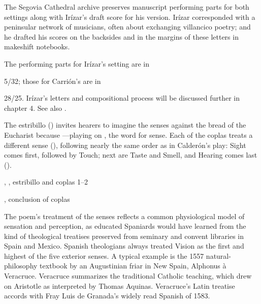 The Segovia Cathedral archive preserves manuscript performing parts for both settings along with Irízar's draft score for his version.
Irízar corresponded with a peninsular network of musicians, often about exchanging villancico poetry; and he drafted his scores on the backsides and in the margins of these letters in makeshift notebooks.
\begin{Footnote}
    The performing parts for Irízar's setting are in \signature{E-SE}{5/32}; those for Carrión's are in \signature{E-SE}{28/25}.
    Irízar's letters and compositional process will be discussed further in chapter 4. %
    See also \Autocites{LopezCalo:IrizarLetters1}{Olarte:Irizar}{Rodriguez:Networks}.
\end{Footnote}

The estribillo () invites hearers to imagine the senses  against the bread of the Eucharist because ---playing on , the word for sense.
Each of the coplas treats a different sense (), following nearly the same order as in Calderón's play: 
Sight comes first, followed by Touch; next are Taste and Smell, and Hearing comes last ().

\begin{expoem}
    \caption{, , estribillo and coplas 1--2}
    \label{expoem:Si_los_sentidos-Sanchez-estribillo}
\end{expoem}
\begin{expoem}
    \caption{, conclusion of coplas}
    \label{expoem:Si_los_sentidos-Sanchez-coplas}
\end{expoem}


The poem's treatment of the senses reflects a common physiological model of sensation and perception, as educated Spaniards would have learned from the kind of theological treatises preserved from seminary and convent libraries in Spain and Mexico.
Spanish theologians always treated Vision as the first and highest of the five exterior senses.
A typical example is the 1557 natural-philosophy textbook  by an Augustinian friar in New Spain, Alphonus à Veracruce.%
    \Autocite{Veracruce:Phisica}
Veracruce summarizes the traditional Catholic teaching, which drew on Aristotle as interpreted by Thomas Aquinas.
Veracruce's Latin treatise accords with Fray Luis de Granada's widely read Spanish  of 1583.%
    \Autocites{LuisdeGranada:Simbolo}[(part I)]{LuisdeGranada-Balcells:SimboloPtI}

